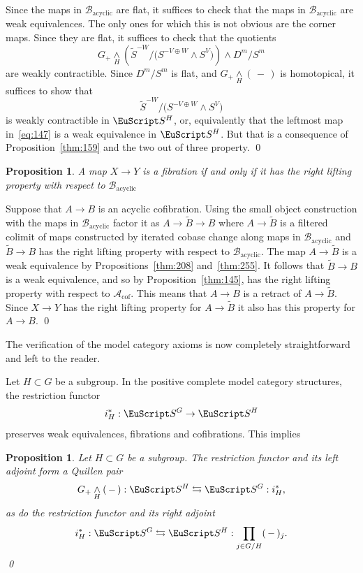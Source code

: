 \documentclass{amsart}
\newtheorem{prop}[equation]{Proposition}
\theoremstyle{definition}
\theoremstyle{remark}
\newenvironment{pf}{\bigskip{\em Proof:\/}}{\qed\medskip}
\newcommand{\slot}{\,-\,}
\newcommand{\spectra}{\EuScript S}
\newcommand{\smashove}[1]{\underset{#1}{\wedge}}
\newcommand{\ugspectra}[1]{\spectra^{#1}}
\newcommand{\gencof}{\mathcal A_{\text{cof}}}
\newcommand{\genacyclic}{\mathcal B_{\text{acyclic}}}
\begin{document}
\begin{pf}
Since the maps in $\genacyclic$ are flat, it suffices to check that the
maps in $\genacyclic$ are weak equivalences.   The only ones for which
this is not obvious are the corner maps.   Since they are flat, it
suffices to check that the quotients 
\[
G_{+}\underset{H}\wedge \left(\tilde S^{-W}/\big(S^{-V\oplus W}\wedge
S^{V}\big)\right)\wedge D^{m}/S^{m}
\]
are weakly contractible.  Since $D^{m}/S^{m}$ is flat, and
$G_{+}\underset{H}{\wedge}(\slot)$ is homotopical, it suffices to show
that
\[
\tilde S^{-W}/\big(S^{-V\oplus W}\wedge S^{V}\big)
\]
is weakly contractible in $\ugspectra{H}$, or, equivalently that the
leftmost map in~\eqref{eq:147} is a weak equivalence in
$\ugspectra{H}$.  But that is a consequence of
Proposition~\ref{thm:159} and the two out of three property.
\end{pf}

\begin{prop}
\label{thm:257}
A map $X\to Y$ is a fibration if and only if it has the right lifting
property with respect to $\genacyclic$
\end{prop}

\begin{pf}
Suppose that $A\to B$ is an acyclic cofibration.  Using the small
object construction with the maps in $\genacyclic$ factor it as
$A\to\tilde B\to B$ where $A\to \tilde B$ is a filtered colimit of
maps constructed by iterated cobase change along maps in $\genacyclic$
and $\tilde B\to B$ has the right lifting property with respect to
$\genacyclic$.  The map $A\to\tilde B$ is a weak equivalence by
Propositions~\ref{thm:208} and~\ref{thm:255}.  It follows that $\tilde
B\to B$ is a weak equivalence, and so by Proposition~\ref{thm:145},
has the right lifting property with respect to $\gencof$.  This means
that $A\to B$ is a retract of $A\to \tilde B$.  Since $X\to Y$ has the
right lifting property for $A\to\tilde B$ it also has this property
for $A\to B$.
\end{pf}

The verification of the model category axioms is now completely
straightforward and left to the reader. 

Let $H\subset G$ be a subgroup.
In the positive complete model category structures, the restriction functor
\[
i_{H}^{\ast}:\ugspectra{G}\to\ugspectra{H}
\]
preserves weak equivalences, fibrations and cofibrations.  This
implies

\begin{prop}
Let $H\subset G$ be a subgroup.   The restriction functor and its left
adjoint form a Quillen pair
\[
G_{+}\smashove{H}(\slot): \ugspectra{H} \leftrightarrows \ugspectra{G}:i_{H}^{\ast},
\]
as do the restriction functor and its right adjoint
\[
i_{H}^{\ast}: \ugspectra{G} \leftrightarrows \ugspectra{H}:\prod_{j\in
G/H}(\slot)_{j}.
\]
\qed
\end{prop}
\end{document}
